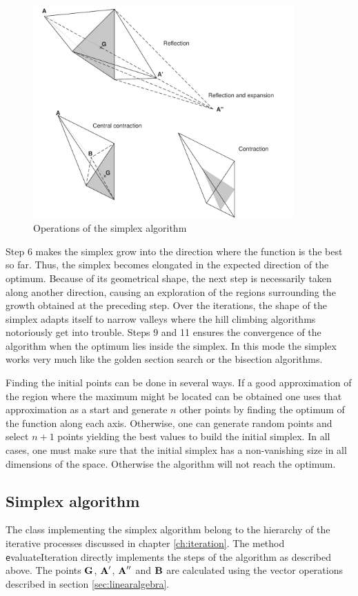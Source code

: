 \begin{figure}
\centering\includegraphics[width=10cm]{Figures/Simplex}
\caption{Operations of the simplex
algorithm}\label{fig:simplexsample}
\end{figure}
Step 6 makes the simplex grow into the direction where the
function is the best so far. Thus, the simplex becomes elongated
in the expected direction of the optimum. Because of its
geometrical shape, the next step is necessarily taken along
another direction, causing an exploration of the regions
surrounding the growth obtained at the preceding step. Over the
iterations, the shape of the simplex adapts itself to narrow
valleys where the hill climbing algorithms notoriously get into
trouble. Steps 9 and 11 ensures the convergence of the algorithm
when the optimum lies inside the simplex. In this mode the simplex
works very much like the golden section search or the bisection
algorithms.

Finding the initial points can be done in several ways. If a good
approximation of the region where the maximum might be located can
be obtained one uses that approximation as a start and generate
$n$ other points by finding the optimum of the function along each
axis. Otherwise, one can generate random points and select $n+1$
points yielding the best values to build the initial simplex. In
all cases, one must make sure that the initial simplex has a
non-vanishing size in all dimensions of the space. Otherwise the
algorithm will not reach the optimum.

\subsection{Simplex algorithm}
The class implementing the simplex algorithm belong to the
hierarchy of the iterative processes discussed in chapter
\ref{ch:iteration}. The method {\texttt evaluateIteration} directly
implements the steps of the algorithm as described above. The
points ${\textbf G}$, ${\textbf A}^{\prime}$, ${\textbf A}^{\prime\prime}$ and
${\textbf B}$ are calculated using the vector operations described in
section \ref{sec:linearalgebra}.

